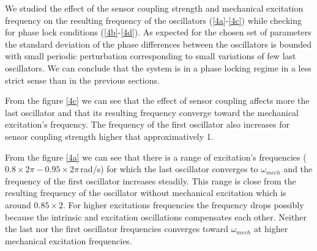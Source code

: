 \documentclass[a4paper]{scrartcl}
\begin{document}
We studied the effect of the sensor coupling strength and mechanical excitation frequency on the resulting frequency of the oscillators (\ref{4a}-\ref{4c}) while checking for phase lock conditions (\ref{4b}-\ref{4d}). As expected for the chosen set of parameters the standard deviation of the phase differences between the oscillators is bounded with small periodic perturbation corresponding to small variations of few last oscillators. We can conclude that the system is in a phase locking regime in a less strict sense than in the previous sections.

From the figure \ref{4c} we can see that the effect of sensor coupling affects more the last oscillator and that its resulting frequency converge toward the mechanical excitation's frequency. The frequency of the first oscillator also increases for sensor coupling strength higher that approximatively 1.

From the figure \ref{4a} we can see that there is a range of excitation's frequencies ($0.8\times2\pi-0.95\times2\pi$\,rad/s) for which the last oscillator converges to $\omega_{mech}$ and the frequency of the first oscillator increases steadily. This range is close from the resulting frequency of the oscillator without mechanical excitation which is around $0.85\times2$. For higher excitations frequencies the frequency drops possibly because the intrinsic and excitation oscillations compensates each other. Neither the last nor the first oscillator frequencies converges toward $\omega_{mech}$ at higher mechanical excitation frequencies.
\newpage
\end{document}
